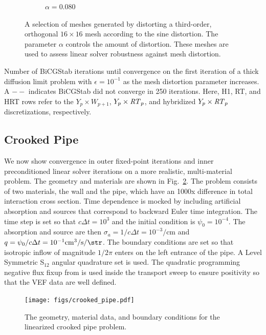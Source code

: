 \documentclass[../doc.tex]{subfiles}
\begin{document}
\begin{figure}
\begin{subfigure}{.24\textwidth}
	\caption{$\alpha = 0.080$}
\end{subfigure}
\caption{A selection of meshes generated by distorting a third-order, orthogonal $16\times 16$ mesh according to the sine distortion. The parameter $\alpha$ controls the amount of distortion. These meshes are used to assess linear solver robustness against mesh distortion. }
\label{rtvef:sine_meshes}
\end{figure}

\begin{table}
\centering
\caption{Number of BiCGStab iterations until convergence on the first iteration of a thick diffusion limit problem with $\epsilon = 10^{-1}$ as the mesh distortion parameter increases. A $--$ indicates BiCGStab did not converge in 250 iterations. Here, H1, RT, and HRT rows refer to the $Y_p\times W_{p+1}$, $Y_p\times \mathit{RT}_p$, and hybridized $Y_p\times \mathit{RT}_p$ discretizations, respectively.}
\label{rtvef:curved_solvers}

\end{table}

\subsection{Crooked Pipe} \label{rtvef_sec:cp}
We now show convergence in outer fixed-point iterations and inner preconditioned linear solver iterations on a more realistic, multi-material problem. The geometry and materials are shown in Fig.~\ref{rtvef:cp_diag}. The problem consists of two materials, the wall and the pipe, which have an 1000x difference in total interaction cross section. Time dependence is mocked by including artificial absorption and sources that correspond to backward Euler time integration. The time step is set so that $c\Delta t = 10^3$ and the initial condition is $\psi_0 = 10^{-4}$. The absorption and source are then $\sigma_a = 1/c\Delta t = 10^{-3} \si{\per\cm}$ and $q = \psi_0/c\Delta t = 10^{-1} \si{\per\cm\cubed\per\s\per\str}$. The boundary conditions are set so that isotropic inflow of magnitude $1/2\pi$ enters on the left entrance of the pipe. A Level Symmetric S$_{12}$ angular quadrature set is used. The quadratic programming negative flux fixup from \cite{YEE2020109696} is used inside the transport sweep to ensure positivity so that the VEF data are well defined. 
\begin{figure}
\centering
\texttt{[image: figs/crooked\_pipe.pdf]}
\caption{The geometry, material data, and boundary conditions for the linearized crooked pipe problem. }
\label{rtvef:cp_diag}
\end{figure}
\end{document}
